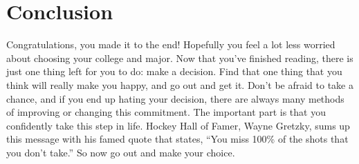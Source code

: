 \chapter{Conclusion}

	Congratulations, you made it to the end! Hopefully you feel a lot less worried about choosing your college and major. Now that you’ve finished reading, there is just one thing left for you to do: make a decision. Find that one thing that you think will really make you happy, and go out and get it. Don’t be afraid to take a chance, and if you end up hating your decision, there are always many methods of improving or changing this commitment. The important part is that you confidently take this step in life. Hockey Hall of Famer, Wayne Gretzky, sums up this message with his famed quote that states, “You miss 100\% of the shots that you don’t take.” So now go out and make your choice. 

